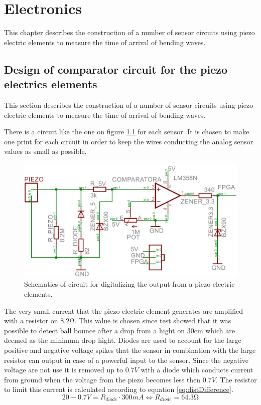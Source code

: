 \chapter{Electronics} %
\label{chap:electronics}
This chapter describes the construction of a number of sensor circuits using piezo electric elements to measure the time of arrival of bending waves.
\section{Design of comparator circuit for the piezo electrics elements}
This section describes the construction of a number of sensor circuits using piezo electric elements to measure the time of arrival of bending waves.

There is a circuit like the one on figure \ref{fig:print} for each sensor. It is chosen to make one print for each circuit in order to keep the wires conducting the analog sensor values as small as possible.
\begin{figure}[htb]
	\centering
	\includegraphics[width=.8\textwidth]{figures/Print}
	\caption{Schematics of circuit for digitalizing the output from a piezo electric elements.}
	\label{fig:print}
\end{figure}
The very small current that the piezo electric element generates are amplified with a resistor on $8.2\si{\ohm}$. This value is chosen since test showed that it was possible to detect ball bounce after a drop from a hight on $30\si{\centi\meter}$ which are deemed as the minimum drop hight.
Diodes are used to account for the large positive and negative voltage spikes that the sensor in combination with the large resistor can output in case of a powerful input to the sensor.
Since the negative voltage are not use it is removed up to $0.7V$ with a diode which conducts current from ground when the voltage from the piezo becomes less then $0.7V$.
The resistor to limit this current is calculated according to equation \ref{eq:distDifference}.
\begin{equation}
20 - 0.7 V = R_{diode} \cdot 300mA \Leftrightarrow R_{diode} = 64.3\si{\ohm}
\label{diodeResistor}
\end{equation}

